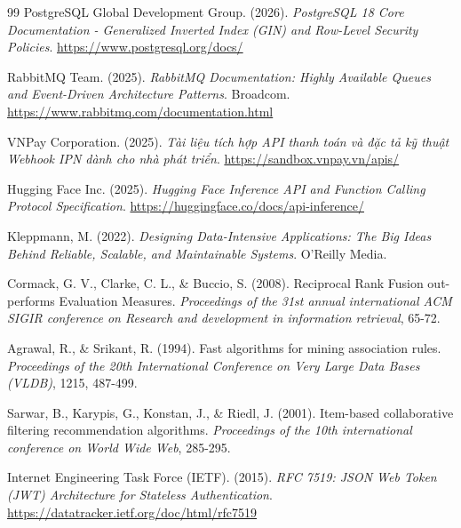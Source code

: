 \documentclass[12pt,a4paper]{report}
\begin{document}
\begin{thebibliography}{99}
PostgreSQL Global Development Group. (2026). \textit{PostgreSQL 18 Core Documentation - Generalized Inverted Index (GIN) and Row-Level Security Policies}. \url{https://www.postgresql.org/docs/}

RabbitMQ Team. (2025). \textit{RabbitMQ Documentation: Highly Available Queues and Event-Driven Architecture Patterns}. Broadcom. \url{https://www.rabbitmq.com/documentation.html}

VNPay Corporation. (2025). \textit{Tài liệu tích hợp API thanh toán và đặc tả kỹ thuật Webhook IPN dành cho nhà phát triển}. \url{https://sandbox.vnpay.vn/apis/}

Hugging Face Inc. (2025). \textit{Hugging Face Inference API and Function Calling Protocol Specification}. \url{https://huggingface.co/docs/api-inference/}

Kleppmann, M. (2022). \textit{Designing Data-Intensive Applications: The Big Ideas Behind Reliable, Scalable, and Maintainable Systems}. O'Reilly Media.

Cormack, G. V., Clarke, C. L., \& Buccio, S. (2008). Reciprocal Rank Fusion out-performs Evaluation Measures. \textit{Proceedings of the 31st annual international ACM SIGIR conference on Research and development in information retrieval}, 65-72.

Agrawal, R., \& Srikant, R. (1994). Fast algorithms for mining association rules. \textit{Proceedings of the 20th International Conference on Very Large Data Bases (VLDB)}, 1215, 487-499.

Sarwar, B., Karypis, G., Konstan, J., \& Riedl, J. (2001). Item-based collaborative filtering recommendation algorithms. \textit{Proceedings of the 10th international conference on World Wide Web}, 285-295.

Internet Engineering Task Force (IETF). (2015). \textit{RFC 7519: JSON Web Token (JWT) Architecture for Stateless Authentication}. \url{https://datatracker.ietf.org/doc/html/rfc7519}

\end{thebibliography}
\end{document}
